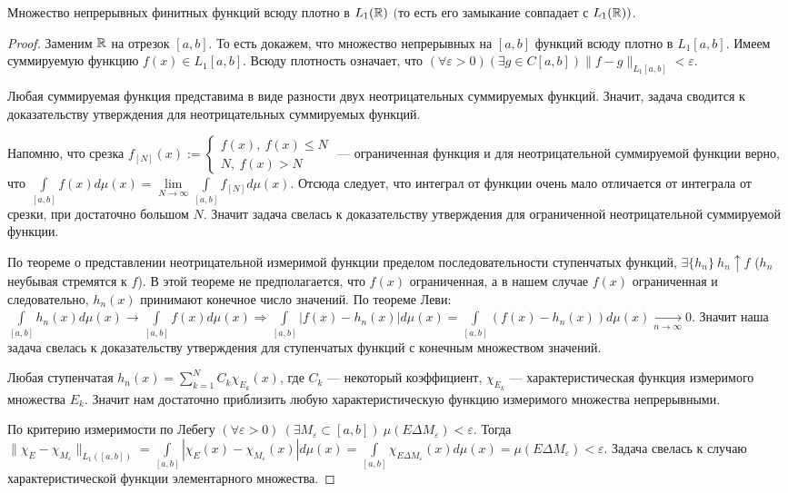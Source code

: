 \begin{lemma}
	Множество\label{lemma_1} непрерывных финитных функций всюду плотно в $L_1(\mathbb{R})$ $($то есть его замыкание совпадает с $L_1(\mathbb{R}))$.
\end{lemma}
\begin{proof}
	Заменим $\mathbb{R}$ на отрезок $[a,b]$. То есть докажем, что множество непрерывных на $[a,b]$ функций всюду плотно в $L_1[a,b]$. Имеем суммируемую функцию $f(x)\in L_1[a,b]$. Всюду плотность означает, что ${(\forall\varepsilon >0)} {(\exists g\in C[a,b])} \parallel f-g\parallel_{L_1[a,b]}<\varepsilon$.
	
  Любая суммируемая функция представима в виде разности двух неотрицательных суммируемых функций. Значит, задача сводится к доказательству утверждения для неотрицательных суммируемых функций.
 
 Напомню, что срезка $f_{[N]} (x) := \begin{cases}
 	f(x),\ f(x)\leqslant N\\
 	N,\ f(x) > N
 \end{cases}$ --- ограниченная функция и для неотрицательной суммируемой функции верно, что $\int\limits_{[a,b]}f(x)d\mu(x)=\lim\limits_{N\to\infty}\int\limits_{[a,b]}f_{[N]}d\mu(x)$.  Отсюда следует, что интеграл от функции очень мало отличается от интеграла от срезки, при достаточно большом $N$. Значит задача свелась к доказательству утверждения для ограниченной неотрицательной суммируемой функции.
 
 По теореме о представлении неотрицательной измеримой функции пределом последовательности ступенчатых функций, $\exists \{h_n\}\  h_n \uparrow f$ ($h_n$ неубывая стремятся к $f$). В этой теореме не предполагается, что $f(x)$ ограниченная, а в нашем случае $f(x)$ ограниченная и следовательно, $h_n(x)$ принимают конечное число значений. По теореме Леви: 
		$	\int\limits_{[a,b]} h_n(x)d\mu(x)\rightarrow \int\limits_{[a,b]}f(x)d\mu(x)\Rightarrow
			\int\limits_{[a,b]}|f(x)-h_n(x)|d\mu(x)=\int\limits_{[a,b]}(f(x)-h_n(x))d\mu(x)\underset{n\to\infty}{\to}0.$
Значит наша задача свелась к доказательству утверждения для ступенчатых функций с конечным множеством значений.

Любая ступенчатая $h_n(x)=\sum\limits_{k=1}^N C_k\chi_{E_k}(x)$, где $C_k$ --- некоторый коэффициент, $\chi_{E_k}$ --- характеристическая функция измеримого множества $E_k$. Значит нам достаточно приблизить любую характеристическую функцию измеримого множества непрерывными.
		
По критерию измеримости по Лебегу $(\forall\varepsilon>0)\ (\exists M_\varepsilon\subset[a,b])\  \mu(E\Delta M_\varepsilon)<\varepsilon$. Тогда ${\parallel \chi_E - \chi_{M_\varepsilon}\parallel_{L_1([a,b])}=\int\limits_{[a,b]}|\chi_{E}(x)-\chi_{M_\varepsilon}(x)|d\mu(x)=\int\limits_{[a,b]}\chi_{E\Delta M_\varepsilon}(x)d\mu(x)=\mu(E\Delta M_\varepsilon)<\varepsilon}$. Задача свелась к случаю характеристической функции элементарного множества.
		

\end{proof}
